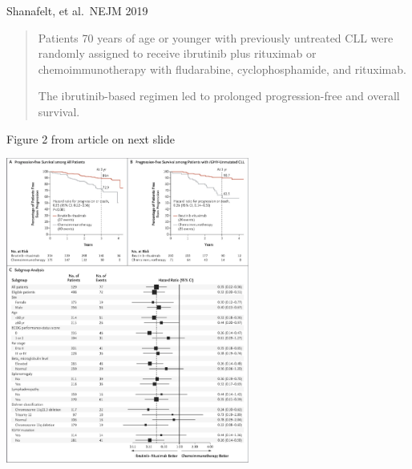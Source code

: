 \documentclass[ignorenonframetext,]{beamer}
\begin{document}
\begin{frame}{Shanafelt, et al.~NEJM 2019}
\protect\hypertarget{shanafelt-et-al.nejm-2019}{}

\begin{quote}

Patients 70 years of age or younger with previously untreated CLL were randomly assigned to receive ibrutinib plus rituximab or chemoimmunotherapy with fludarabine, cyclophosphamide, and rituximab.

The ibrutinib-based regimen led to prolonged progression-free and overall survival.

\end{quote}

Figure 2 from article on next slide

\end{frame}

\begin{frame}

\centering

\includegraphics[width=0.6\textwidth,height=\textheight]{../figures/shanafelt_cll.pdf}

\end{frame}
\end{document}
